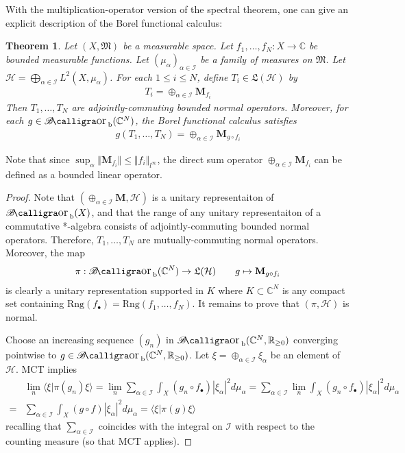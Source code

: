 \documentclass[12pt,b5paper,notitlepage]{article}
\theoremstyle{definition}
\theoremstyle{plain}
\newtheorem{thm}[df]{Theorem}
\DeclareMathOperator{\Borb}{{\mathscr{B}\text{\kern -2pt {\calligra\large or}}\,}_{\mathrm b}}
\newcommand{\fk}{\mathfrak}
\newcommand{\bk}[1]{\langle {#1}\rangle}
\newcommand{\blt}{\bullet}
\newcommand{\Cbb}{\mathbb C}
\newcommand{\Rbb}{\mathbb R}
\newcommand{\Rng}{\mathrm{Rng}}
\newcommand{\MH}{\mathcal H}
\newcommand{\SI}{\mathscr I}
\newcommand{\Mbf}{\mathbf M}
\numberwithin{equation}{section}
\begin{document}
With the multiplication-operator version of the spectral theorem, one can give an explicit description of the Borel functional calculus:





\begin{thm}\label{lb334}
Let $(X,\fk M)$ be a measurable space. Let $f_1,\dots,f_N:X\rightarrow\Cbb$ be bounded measurable functions. Let $(\mu_\alpha)_{\alpha\in\SI}$ be a family of measures on $\fk M$. Let $\MH=\bigoplus_{\alpha\in\SI}L^2(X,\mu_\alpha)$. For each $1\leq i\leq N$, define $T_i\in\fk L(\MH)$ by 
\begin{align*}
T_i=\oplus_{\alpha\in\SI}\Mbf_{f_i}
\end{align*}
Then $T_1,\dots,T_N$ are adjointly-commuting bounded normal operators. Moreover, for each $g\in\Borb(\Cbb^N)$, the Borel functional calculus satisfies
\begin{align}
g(T_1,\dots,T_N)=\oplus_{\alpha\in\SI}\Mbf_{g\circ f_i}
\end{align}
\end{thm}

Note that since $\sup_\alpha\Vert \Mbf_{f_i}\Vert\leq \Vert f_i\Vert_{l^\infty}$, the direct sum operator $\oplus_{\alpha\in\SI}\Mbf_{f_i}$ can be defined as a bounded linear operator.


\begin{proof}
Note that $(\oplus_{\alpha\in\SI}\Mbf,\MH)$ is a unitary representaiton of $\Borb(X)$, and that the range of any unitary representaiton of a commutative *-algebra consists of adjointly-commuting bounded normal operators. Therefore,  $T_1,\dots,T_N$ are mutually-commuting normal operators. Moreover, the map
\begin{align*}
\pi:\Borb(\Cbb^N)\rightarrow \fk L(\MH)\qquad g\mapsto \Mbf_{g\circ f_i} 
\end{align*}
is clearly a unitary representation supported in $K$ where $K\subset\Cbb^N$ is any compact set containing $\Rng(f_\blt)=\Rng(f_1,\dots,f_N)$. It remains to prove that $(\pi,\MH)$ is normal.

Choose an increasing sequence $(g_n)$ in $\Borb(\Cbb^N,\Rbb_{\geq0})$ converging pointwise to $g\in \Borb(\Cbb^N,\Rbb_{\geq0})$. Let $\xi=\oplus_{\alpha\in\SI}\xi_\alpha$ be an element of $\MH$. MCT implies
\begin{align*}
&\lim_n\bk{\xi|\pi(g_n)\xi}=\lim_n \sum_{\alpha\in\SI}\int_X (g_n\circ f_\blt)|\xi_\alpha|^2d\mu_{\alpha}=\sum_{\alpha\in\SI}\lim_n\int_X (g_n\circ f_\blt)|\xi_\alpha|^2d\mu_{\alpha}\\
=&\sum_{\alpha\in\SI}\int_X (g\circ f)|\xi_\alpha|^2d\mu_{\alpha}=\bk{\xi|\pi(g)\xi}
\end{align*}
recalling that $\sum_{\alpha\in\SI}$ coincides with the integral on $\SI$ with respect to the counting measure (so that MCT applies).
\end{proof}
\end{document}
